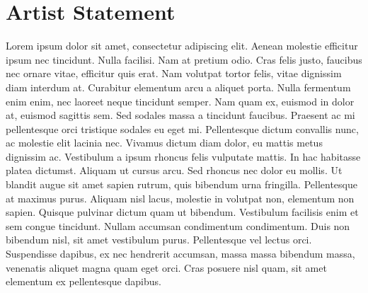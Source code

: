 \documentclass[10pt]{article}
\begin{document}
\section*{Artist Statement}
Lorem ipsum dolor sit amet, consectetur adipiscing elit. Aenean molestie
efficitur ipsum nec tincidunt. Nulla facilisi. Nam at pretium odio. Cras felis
justo, faucibus nec ornare vitae, efficitur quis erat. Nam volutpat tortor
felis, vitae dignissim diam interdum at. Curabitur elementum arcu a aliquet
porta. Nulla fermentum enim enim, nec laoreet neque tincidunt semper. Nam quam
ex, euismod in dolor at, euismod sagittis sem. Sed sodales massa a tincidunt
faucibus. Praesent ac mi pellentesque orci tristique sodales eu eget mi.
Pellentesque dictum convallis nunc, ac molestie elit lacinia nec. Vivamus
dictum diam dolor, eu mattis metus dignissim ac. Vestibulum a ipsum rhoncus
felis vulputate mattis. In hac habitasse platea dictumst. Aliquam ut cursus
arcu. Sed rhoncus nec dolor eu mollis. Ut blandit augue sit amet sapien rutrum,
quis bibendum urna fringilla. Pellentesque at maximus purus. Aliquam nisl
lacus, molestie in volutpat non, elementum non sapien. Quisque pulvinar dictum
quam ut bibendum. Vestibulum facilisis enim et sem congue tincidunt. Nullam
accumsan condimentum condimentum. Duis non bibendum nisl, sit amet vestibulum
purus. Pellentesque vel lectus orci. Suspendisse dapibus, ex nec hendrerit
accumsan, massa massa bibendum massa, venenatis aliquet magna quam eget orci.
Cras posuere nisl quam, sit amet elementum ex pellentesque dapibus. 
\end{document}
